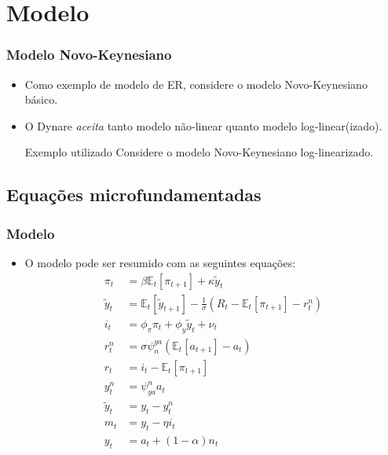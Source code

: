 \documentclass[xcolor=pdftex,dvipsnames,table]{beamer}
\newcommand{\ft}{\frametitle}
\begin{document}

\section{Modelo}

\begin{frame}
\ft{Modelo Novo-Keynesiano}

\begin{itemize}
\item Como exemplo de modelo de ER, considere o modelo Novo-Keynesiano básico.

\item O Dynare \textit{aceita} tanto modelo não-linear quanto modelo log-linear(izado).

\begin{block}{Exemplo utilizado}
Considere o modelo Novo-Keynesiano log-linearizado.
\end{block} 

\end{itemize}
\end{frame}

\subsection{Equações microfundamentadas}
\begin{frame}[fragile]
\ft{Modelo}
\begin{itemize}
\item O modelo pode ser resumido com as seguintes equações:
\vspace{-0.4cm}
\begin{align}
\pi_t &= \beta \mathbb{E}_t[\pi_{t+1}] + \kappa	\tilde{y}_t
\label{eq1} \\
\tilde{y}_t &= \mathbb{E}_t[\tilde{y}_{t+1}] - \frac{1}{\sigma}\left(R_t - \mathbb{E}_t[\pi_{t+1}] - r_t^n \right) 
\label{eq2} \\
i_t &= \phi_{\pi} \pi_t +\phi_y \tilde{y}_t + \nu_t
\label{eq3}\\
r_t^n &= \sigma \psi_n^{ya}(\mathbb{E}_t[a_{t+1}] - a_t)
\label{eq4}\\
r_t &= i_t - \mathbb{E}_t[\pi_{t+1}]
\label{eq5}\\
y_t^n &= \psi_{ya}^n a_t
\label{eq6}\\
\tilde{y}_t &= y_t - y_t^n
\label{eq7}\\
m_t &= y_t - \eta i_t
\label{eq8}\\
y_t &= a_t +(1-\alpha)n_t
\label{eq9}
\end{align}

\end{itemize}
\end{frame}
\end{document}
